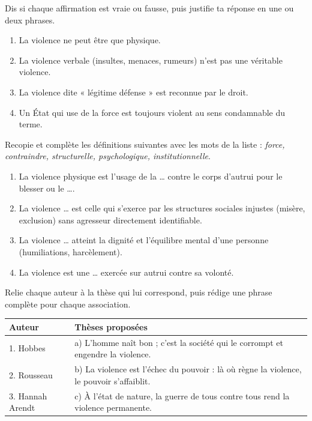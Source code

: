 \documentclass[11pt]{article}
\newcommand{\cle}[1]{{\popxbold\color{popdark}#1}}
\begin{document}
\begin{exercice}
Dis si chaque affirmation est vraie ou fausse, puis justifie ta réponse en une ou deux phrases.
\begin{enumerate}
\item La violence ne peut être que physique.
\item La violence verbale (insultes, menaces, rumeurs) n'est pas une véritable violence.
\item La violence dite « légitime défense » est reconnue par le droit.
\item Un État qui use de la force est toujours violent au sens condamnable du terme.
\end{enumerate}
\end{exercice}

\begin{exercice}
Recopie et complète les définitions suivantes avec les mots de la liste : \emph{force, contraindre, structurelle, psychologique, institutionnelle}.
\begin{enumerate}
\item La violence \cle{physique} est l'usage de la \ldots{} contre le corps d'autrui pour le blesser ou le \ldots{}.
\item La violence \ldots{} est celle qui s'exerce par les structures sociales injustes (misère, exclusion) sans agresseur directement identifiable.
\item La violence \ldots{} atteint la dignité et l'équilibre mental d'une personne (humiliations, harcèlement).
\item La violence est une \ldots{} exercée sur autrui contre sa volonté.
\end{enumerate}
\end{exercice}

\begin{exercice}
Relie chaque auteur à la thèse qui lui correspond, puis rédige une phrase complète pour chaque association.
\begin{center}
\begin{tabularx}{\linewidth}{|l|X|}
\hline
\rowcolor{popblueL} \textbf{Auteur} & \textbf{Thèses proposées} \\
\hline
1. Hobbes & a) L'homme naît bon ; c'est la société qui le corrompt et engendre la violence. \\
\hline
2. Rousseau & b) La violence est l'échec du pouvoir : là où règne la violence, le pouvoir s'affaiblit. \\
\hline
3. Hannah Arendt & c) À l'état de nature, la guerre de tous contre tous rend la violence permanente. \\
\hline
\end{tabularx}
\end{center}
\end{exercice}
\end{document}

